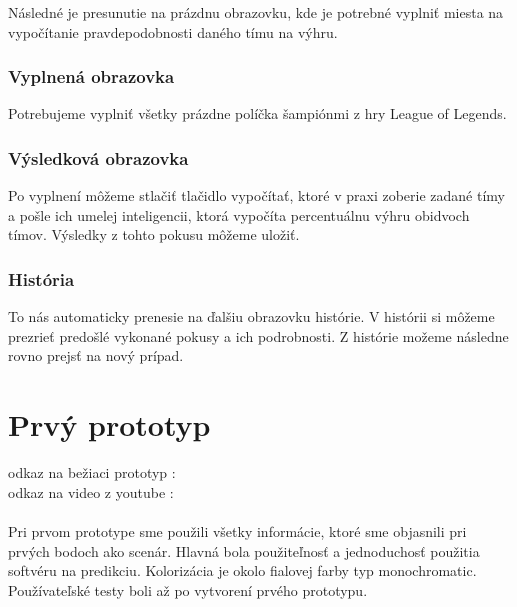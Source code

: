 Následné je presunutie na prázdnu obrazovku, kde je potrebné vyplniť miesta na vypočítanie pravdepodobnosti daného tímu na výhru.

\subsubsection{Vyplnená obrazovka}

Potrebujeme vyplniť všetky prázdne políčka šampiónmi z hry League of Legends.

\subsubsection{Výsledková obrazovka}

Po vyplnení môžeme stlačiť tlačidlo vypočítať, ktoré v praxi zoberie zadané tímy a pošle ich umelej inteligencii, ktorá vypočíta percentuálnu výhru obidvoch tímov. Výsledky z tohto pokusu môžeme uložiť.

\subsubsection{História}

To nás automaticky prenesie na ďalšiu obrazovku histórie. V histórii si môžeme prezrieť predošlé vykonané pokusy a ich podrobnosti. Z histórie možeme následne rovno prejsť na nový prípad.





\section{Prvý prototyp}

odkaz na bežiaci prototyp :
\cite{figma}
\\
odkaz na video z youtube :
\cite{youtube}
	\\ \\
Pri prvom prototype sme použili všetky informácie, ktoré sme objasnili pri prvých bodoch ako scenár. Hlavná bola použiteľnosť a jednoduchosť použitia softvéru na predikciu. Kolorizácia je okolo fialovej farby typ monochromatic. Používateľské testy boli až po vytvorení prvého prototypu. 


